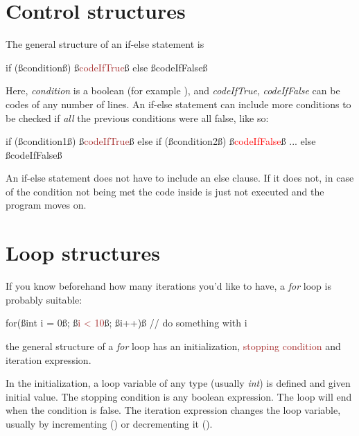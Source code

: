 \section{Control structures}

The general structure of an if-else statement is

\begin{code}
if (ß\textcolor{mygreen}{condition}ß) 
{
    ß\textcolor{Brown}{codeIfTrue}ß
}
else
{
    ß\textcolor{Rhodamine}{codeIfFalse}ß
}
\end{code}

Here, \textit{condition} is a boolean (for example ), and \textit{codeIfTrue}, \textit{codeIfFalse} can be codes of any number of lines. An if-else statement can include more conditions to be checked if \emph{all} the previous conditions were all false, like so:

\begin{code}
if (ß\textcolor{mygreen}{condition1}ß) 
{
    ß\textcolor{Brown}{codeIfTrue}ß
}
else if (ß\textcolor{mygreen}{condition2}ß)
{
    ß\textcolor{Red}{codeIfFalse}ß
}
...
else{
    ß\textcolor{Rhodamine}{codeIfFalse}ß
}
\end{code}

An if-else statement does not have to include an else clause. If it does not, in case of the condition not being met the code inside is just not executed and the program moves on.

\section{Loop structures}

If you know beforehand how many iterations you'd like to have, a \textit{for} loop is probably suitable:

\begin{code}
for(ß\textcolor{mygreen}{int i = 0}ß; ß\textcolor{Brown}{i < 10}ß; ß\textcolor{Rhodamine}{i++})ß {
    // do something with i
}
\end{code}

the general structure of a \textit{for} loop has an \textcolor{mygreen}{initialization}, \textcolor{Brown}{stopping condition} and \textcolor{Rhodamine}{iteration expression}. 

In the initialization, a loop variable of any type (usually \textit{int}) is defined and given initial value. The stopping condition is any boolean expression. The loop will end when the condition is false. The iteration expression changes the loop variable, usually by incrementing () or decrementing it ().

